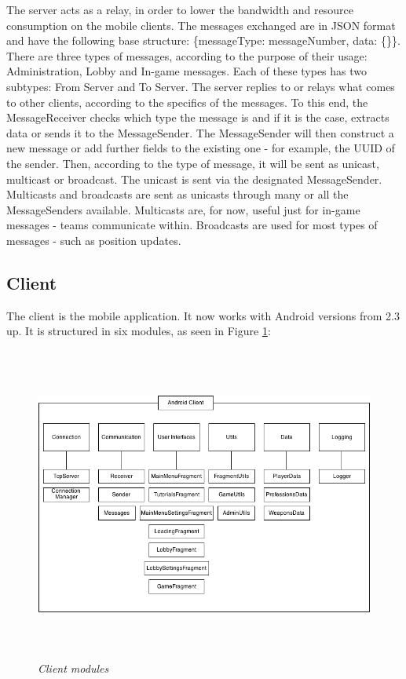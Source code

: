 The server acts as a relay, in order to lower the bandwidth and
resource consumption on the mobile clients. The messages exchanged are in
JSON format and have the following base structure: \{messageType: messageNumber,
data: \{\}\}. There are three types of messages, according to the purpose of
their usage: Administration, Lobby and In-game messages. Each of these types has
two subtypes: From Server and To Server. The server replies to or relays what
comes to other clients, according to the specifics of the messages. To this
end, the MessageReceiver checks which type the message is and if it is the case, extracts
data or sends it to the MessageSender. The MessageSender will then construct a
new message or add further fields to the existing one - for example, the UUID of
the sender. Then, according to the type of message, it will be sent as unicast,
multicast or broadcast. The unicast is sent via the designated MessageSender.
Multicasts and broadcasts are sent as unicasts through many or all the
MessageSenders available. Multicasts are, for now, useful just for in-game
messages - teams communicate within. Broadcasts are used for most types
of messages - such as position updates.\newline

\subsection{Client}

The client is the mobile application. It now works with Android versions from
2.3 up. It is structured in six modules, as seen in Figure \ref{fig:clientModules}:

\begin{figure}
\includegraphics[height=4.08in,width=6.23in]{./images/diagrams/client_modules.png}  
\caption{\small \sl Client modules \label{fig:clientModules}}
\end{figure}

